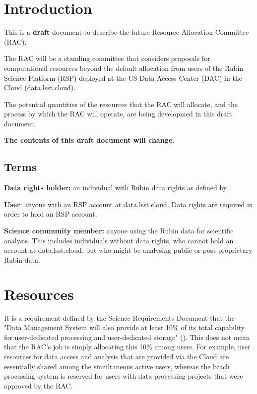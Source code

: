 \section{Introduction}

This is a \textbf{draft} document to describe the future Resource Allocation Committee (RAC).

The RAC will be a standing committee that considers proposals for computational resources beyond the default allocation from users of the Rubin Science Platform (RSP) deployed at the US Data Access Center (DAC) in the Cloud (data.lsst.cloud).

The potential quantities of the resources that the RAC will allocate, and the process by which the RAC will operate, are being developmed in this draft document.

\textbf{The contents of this draft document will change.}


\subsection{Terms}

\textbf{Data rights holder:} an individual with Rubin data rights as defined by .

\textbf{User}: anyone with an RSP account at data.lsst.cloud.
Data rights are required in order to hold an RSP account.

\textbf{Science community member:} anyone using the Rubin data for scientific analysis.
This includes individuals without data rights, who cannot hold an account at data.lsst.cloud, but who might be analysing public or post-proprietary Rubin data.


\section{Resources}\label{sec:resources}

It is a requirement defined by the Science Requirements Document that the "Data Management System will also provide at least 10\% of its total capability for user-dedicated processing and user-dedicated storage" ().
This does not mean that the RAC's job is simply allocating this 10\% among users.
For example, user resources for data access and analysis that are provided via the Cloud are essentially shared among the simultaneous active users, whereas the batch processing system is reserved for users with data processing projects that were approved by the RAC.


